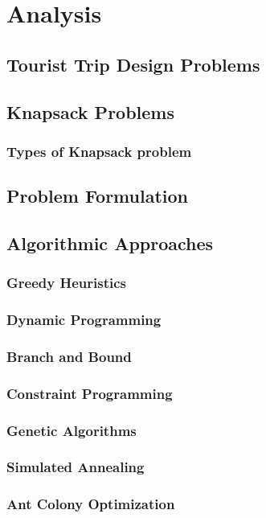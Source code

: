 \chapter{Analysis}\label{chapter:analysis}

\section{Tourist Trip Design Problems}

\section{Knapsack Problems}
\subsection{Types of Knapsack problem}

\section{Problem Formulation}

\section{Algorithmic Approaches}
\subsection{Greedy Heuristics}
\subsection{Dynamic Programming}
\subsection{Branch and Bound}
\subsection{Constraint Programming}
\subsection{Genetic Algorithms}
\subsection{Simulated Annealing}
\subsection{Ant Colony Optimization}

